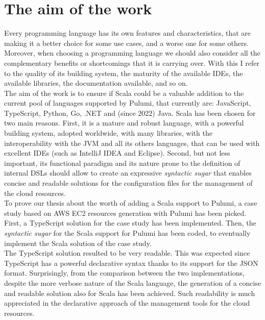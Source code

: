 \section{The aim of the work}
Every programming language has its own features and characteristics, that are making it a better choice for some use cases, and a worse one for some others.
Moreover, when choosing a programming language we should also consider all the complementary benefits or shortcomings that it is carrying over.
With this I refer to the quality of its building system, the maturity of the available IDEs, the available libraries, the documentation available, and so on.\\
The aim of the work is to ensure if Scala could be a valuable addition to the current pool of languages supported by Pulumi, that currently are: JavaScript, TypeScript, Python, Go, .NET and  (since 2022) Java.
Scala has been chosen for two main reasons.
First, it is a mature and robust language, with a powerful building system, adopted worldwide, with many libraries, with the interoperability with the JVM and all its others languages, that can be used with excellent IDEs (such as IntelliJ IDEA and Eclipse).
Second, but not less important, its functional paradigm and its nature prone to the definition of \gls{internal DSL}s should allow to create an expressive \textit{syntactic sugar} that enables concise and readable solutions for the configuration files for the management of the cloud resources.\\
To prove our thesis about the worth of adding a Scala support to Pulumi, a case study based on AWS EC2 resources generation with Pulumi has been picked.
First, a TypeScript solution for the case study has been implemented.
Then, the \textit{syntactic sugar} for the Scala support for Pulumi has been coded, to eventually implement the Scala solution of the case study.\\
The TypeScript solution resulted to be very readable. This was expected since TypeScript has a powerful declarative syntax thanks to its support for the JSON format.
Surprisingly, from the comparison between the two implementations, despite the more verbose nature of the Scala language, the generation of a concise and readable solution also for Scala has been achieved.
Such readability is much appreciated in the declarative approach of the management tools for the cloud resources.
